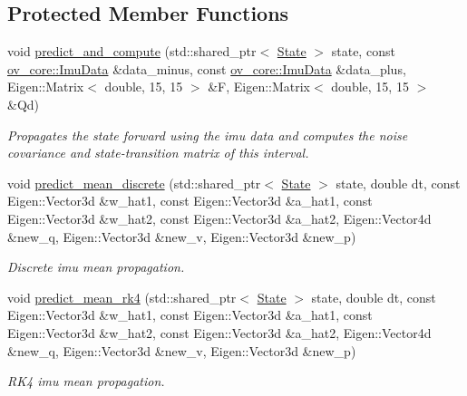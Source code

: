 \subsection*{Protected Member Functions}
\begin{DoxyCompactItemize}
\item 
void \hyperlink{classov__msckf_1_1Propagator_a3e7cfb88ec2c5eb7e090e0e6fe48225e}{predict\+\_\+and\+\_\+compute} (std\+::shared\+\_\+ptr$<$ \hyperlink{classov__msckf_1_1State}{State} $>$ state, const \hyperlink{structov__core_1_1ImuData}{ov\+\_\+core\+::\+Imu\+Data} \&data\+\_\+minus, const \hyperlink{structov__core_1_1ImuData}{ov\+\_\+core\+::\+Imu\+Data} \&data\+\_\+plus, Eigen\+::\+Matrix$<$ double, 15, 15 $>$ \&F, Eigen\+::\+Matrix$<$ double, 15, 15 $>$ \&Qd)
\begin{DoxyCompactList}\small\item\em Propagates the state forward using the imu data and computes the noise covariance and state-\/transition matrix of this interval. \end{DoxyCompactList}\item 
void \hyperlink{classov__msckf_1_1Propagator_a038285deaa51724081651471a8de298f}{predict\+\_\+mean\+\_\+discrete} (std\+::shared\+\_\+ptr$<$ \hyperlink{classov__msckf_1_1State}{State} $>$ state, double dt, const Eigen\+::\+Vector3d \&w\+\_\+hat1, const Eigen\+::\+Vector3d \&a\+\_\+hat1, const Eigen\+::\+Vector3d \&w\+\_\+hat2, const Eigen\+::\+Vector3d \&a\+\_\+hat2, Eigen\+::\+Vector4d \&new\+\_\+q, Eigen\+::\+Vector3d \&new\+\_\+v, Eigen\+::\+Vector3d \&new\+\_\+p)
\begin{DoxyCompactList}\small\item\em Discrete imu mean propagation. \end{DoxyCompactList}\item 
void \hyperlink{classov__msckf_1_1Propagator_abfc8dcea867622ef57e740e5ab884538}{predict\+\_\+mean\+\_\+rk4} (std\+::shared\+\_\+ptr$<$ \hyperlink{classov__msckf_1_1State}{State} $>$ state, double dt, const Eigen\+::\+Vector3d \&w\+\_\+hat1, const Eigen\+::\+Vector3d \&a\+\_\+hat1, const Eigen\+::\+Vector3d \&w\+\_\+hat2, const Eigen\+::\+Vector3d \&a\+\_\+hat2, Eigen\+::\+Vector4d \&new\+\_\+q, Eigen\+::\+Vector3d \&new\+\_\+v, Eigen\+::\+Vector3d \&new\+\_\+p)
\begin{DoxyCompactList}\small\item\em R\+K4 imu mean propagation. \end{DoxyCompactList}\end{DoxyCompactItemize}
